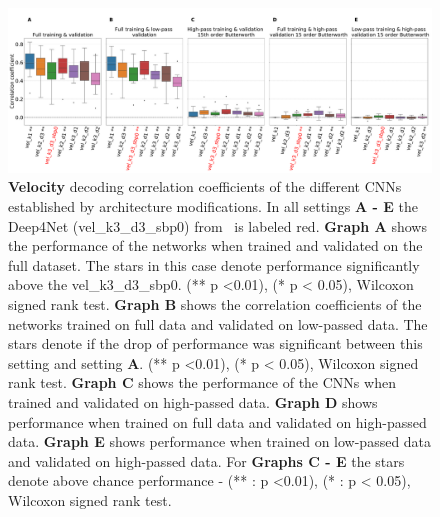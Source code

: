 \begin{itemize}
\begin{figure}[!htpb]
\centering
   \includegraphics[width=1\linewidth]{img/ch4/original_setting_vel_performance_comparison}
   \caption{\textbf{Velocity} decoding correlation coefficients of the different CNNs established by architecture modifications. In all settings \textbf{
   A - E} the Deep4Net (vel\_k3\_d3\_sbp0) from~\cite{Hammer-2021} is labeled red. \textbf{Graph A} shows the performance of the networks when trained and validated on the full dataset. The stars in this case denote performance significantly above the vel\_k3\_d3\_sbp0. (** p <0.01), (* p < 0.05), Wilcoxon signed rank test.
   \textbf{Graph B} shows the correlation coefficients of the networks trained on full data and validated on low-passed data. 
   The stars denote if the drop of performance was significant between this setting and setting \textbf{A}. (** p <0.01), (* p < 0.05), Wilcoxon signed rank test.
   \textbf{Graph C} shows the performance of the CNNs when trained and validated on high-passed data. \textbf{Graph D} shows performance when trained on full data and validated on high-passed data. \textbf{Graph E} shows performance when trained on low-passed data and validated on high-passed data. For \textbf{Graphs C - E} the stars denote above chance performance - (** : p <0.01), (* : p < 0.05), Wilcoxon signed rank test.}
   \label{fig:original-performances-velocity} 
\end{figure}


\end{itemize}
